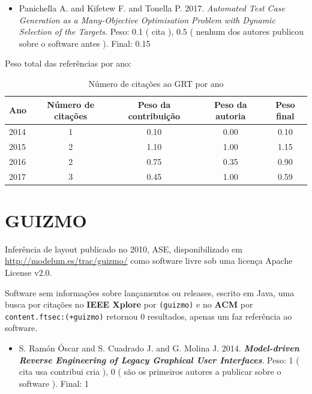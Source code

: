 \begin{itemize}
\item Panichella A. and Kifetew F. and Tonella P.
      2017.
        \textit{ Automated Test Case Generation as a Many-Objective Optimisation Problem with Dynamic Selection of the Targets}.
      Peso:
      0.1 (
          cita
      ),
      0.5 (
nenhum dos autores publicou sobre o software antes
      ).
      Final:
      0.15

\end{itemize}

Peso total das referências por ano:

\begin{table}[h]
\caption{Número de citações ao GRT  por ano}
\centering
\begin{tabular}{| l | c | c | c | c |}
  \hline
  Ano & Número de citações & Peso da contribuição & Peso da autoria & Peso final \\
  \hline
  2014
    & 1
    & 0.10
    & 0.00
    & 0.10 \\
  2015
    & 2
    & 1.10
    & 1.00
    & 1.15 \\
  2016
    & 2
    & 0.75
    & 0.35
    & 0.90 \\
  2017
    & 3
    & 0.45
    & 1.00
    & 0.59 \\
  \hline
\end{tabular}
\end{table}


\section{GUIZMO}

Inferência de layout
publicado no 2010, ASE,
disponibilizado em \url{http://modelum.es/trac/guizmo/}
como software livre
sob uma licença Apache License v2.0.

Software sem informações sobre lançamentos ou releases,
escrito em Java,
uma busca por citações no {\bf IEEE Xplore} por
\texttt{(guizmo)}
e no {\bf ACM} por
\texttt{content.ftsec:(+guizmo)}
retornou
0 resultados,
apenas um faz referência ao software.

\begin{itemize}
\item S. Ram\'{o}n \'{O}scar and S. Cuadrado J. and G. Molina J.
      2014.
        \textbf{\textit{ Model-driven Reverse Engineering of Legacy Graphical User Interfaces}}.
      Peso:
      1 (
          cita
          usa
          contribui
          cria
      ),
      0 (
são os primeiros autores a publicar sobre o software
      ).
      Final:
      1

\end{itemize}

